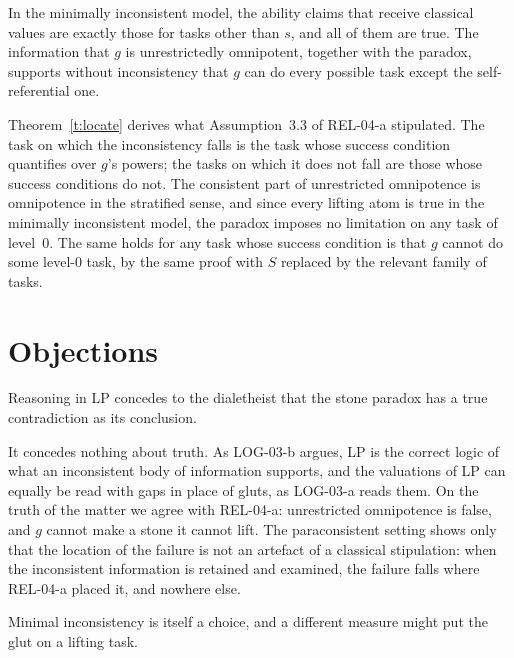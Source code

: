 \documentclass{situationist-preprint}
\begin{document}
\begin{corollary}\label{c:classical}
In the minimally inconsistent model, the ability claims that receive classical values are exactly those for tasks other than $s$, and all of them are true. The information that $g$ is unrestrictedly omnipotent, together with the paradox, supports without inconsistency that $g$ can do every possible task except the self-referential one.
\end{corollary}

Theorem~\ref{t:locate} derives what Assumption~3.3 of REL-04-a stipulated. The task on which the inconsistency falls is the task whose success condition quantifies over $g$'s powers; the tasks on which it does not fall are those whose success conditions do not. The consistent part of unrestricted omnipotence is omnipotence in the stratified sense, and since every lifting atom is true in the minimally inconsistent model, the paradox imposes no limitation on any task of level~$0$. The same holds for any task whose success condition is that $g$ cannot do some level-$0$ task, by the same proof with $S$ replaced by the relevant family of tasks.

\section{Objections}

\begin{objection}
Reasoning in LP concedes to the dialetheist that the stone paradox has a true contradiction as its conclusion.
\end{objection}

\begin{reply}
It concedes nothing about truth. As LOG-03-b argues, LP is the correct logic of what an inconsistent body of information supports, and the valuations of LP can equally be read with gaps in place of gluts, as LOG-03-a reads them. On the truth of the matter we agree with REL-04-a: unrestricted omnipotence is false, and $g$ cannot make a stone it cannot lift. The paraconsistent setting shows only that the location of the failure is not an artefact of a classical stipulation: when the inconsistent information is retained and examined, the failure falls where REL-04-a placed it, and nowhere else.
\end{reply}

\begin{objection}
Minimal inconsistency is itself a choice, and a different measure might put the glut on a lifting task.
\end{objection}
\end{document}
